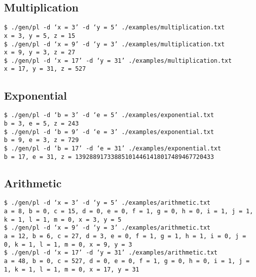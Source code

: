 \documentclass[letterpaper,11pt]{article}
\begin{document}
{{		\subsection {Multiplication}
		{
			\texttt{\$ ./gen/pl -d `x = 3' -d `y = 5' ./examples/multiplication.txt}\\
			\texttt{x = 3, y = 5, z = 15}\\
			\texttt{\$ ./gen/pl -d `x = 9' -d `y = 3' ./examples/multiplication.txt}\\
			\texttt{x = 9, y = 3, z = 27}\\
			\texttt{\$ ./gen/pl -d `x = 17' -d `y = 31' ./examples/multiplication.txt}\\
			\texttt{x = 17, y = 31, z = 527}\\
		}
		
		\subsection {Exponential}
		{
			\texttt{\$ ./gen/pl -d `b = 3' -d `e = 5' ./examples/exponential.txt}\\
			\texttt{b = 3, e = 5, z = 243}\\
			\texttt{\$ ./gen/pl -d `b = 9' -d `e = 3' ./examples/exponential.txt}\\
			\texttt{b = 9, e = 3, z = 729}\\
			\texttt{\$ ./gen/pl -d `b = 17' -d `e = 31' ./examples/exponential.txt}\\
			\texttt{b = 17, e = 31, z = 139288917338851014461418017489467720433}\\
		}
		
		\subsection {Arithmetic}
		{
			\texttt{\$ ./gen/pl -d `x = 3' -d `y = 5' ./examples/arithmetic.txt}\\
			\texttt{a = 8, b = 0, c = 15, d = 0, e = 0, f = 1, g = 0, h = 0, i = 1, j = 1, k = 1, l = 1, m = 0, x = 3, y = 5}\\
			\texttt{\$ ./gen/pl -d `x = 9' -d `y = 3' ./examples/arithmetic.txt}\\
			\texttt{a = 12, b = 6, c = 27, d = 3, e = 0, f = 1, g = 1, h = 1, i = 0, j = 0, k = 1, l = 1, m = 0, x = 9, y = 3}\\
			\texttt{\$ ./gen/pl -d `x = 17' -d `y = 31' ./examples/arithmetic.txt}\\
			\texttt{a = 48, b = 0, c = 527, d = 0, e = 0, f = 1, g = 0, h = 0, i = 1, j = 1, k = 1, l = 1, m = 0, x = 17, y = 31}\\
		}
		
}}
\end{document}
